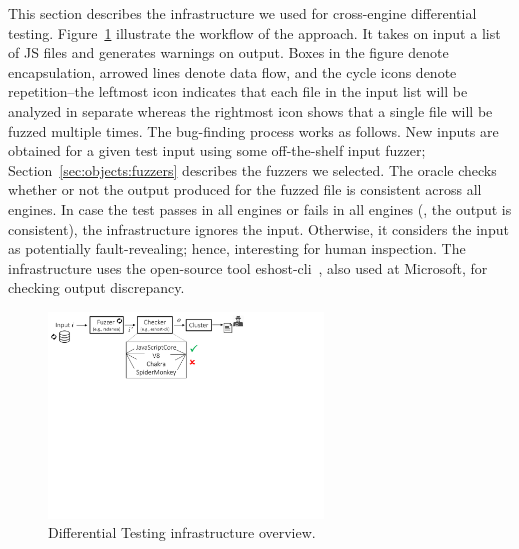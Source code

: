 \documentclass[sigconf,review, anonymous]{acmart}
\begin{document}
This section describes the infrastructure we used for cross-engine
differential testing. Figure~\ref{fig:workflow} illustrate the
workflow of the approach. It takes on input a list of JS files and
generates warnings on output. Boxes in the figure denote
encapsulation, arrowed lines denote data flow, and the cycle icons
denote repetition--the leftmost icon indicates that each file in the
input list will be analyzed in separate whereas the rightmost icon
shows that a single file will be fuzzed multiple times.  The
bug-finding process works as follows. New inputs are obtained for a
given test input using some off-the-shelf input fuzzer;
Section~\ref{sec:objects:fuzzers} describes the fuzzers we selected.
The oracle checks whether or not the output produced for the fuzzed
file is consistent across all engines. In case the test passes in all
engines or fails in all engines (\ie{}, the output is consistent), the
infrastructure ignores the input. Otherwise, it considers the input as
potentially fault-revealing; hence, interesting for human
inspection. The infrastructure uses the
open-source tool eshost-cli~\cite{eshost-cli}, also used at
Microsoft, for checking output discrepancy.

\begin{figure}[t]
  \centering
  \includegraphics[trim=0 350 0 0,clip,width=0.65\textwidth]{diff-testing-runtimes}
  \caption{\label{fig:workflow}Differential Testing infrastructure overview.}
\end{figure}
\end{document}
